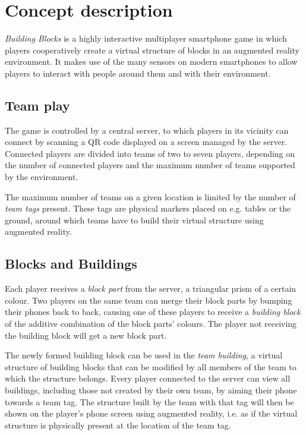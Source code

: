 \documentclass[a4paper,titlepage]{scrartcl}
\begin{document}
\section{Concept description}
\textit{Building Blocks} is a highly interactive multiplayer smartphone game in which players cooperatively create a virtual structure of blocks in an augmented reality environment. It makes use of the many sensors on modern smartphones to allow players to interact with people around them and with their environment.

\subsection{Team play}
The game is controlled by a central server, to which players in its vicinity can connect by scanning a QR code displayed on a screen managed by the server. Connected players are divided into teams of two to seven players, depending on the number of connected players and the maximum number of teams supported by the environment.

The maximum number of teams on a given location is limited by the number of \textit{team tags} present. These tags are physical markers placed on e.g. tables or the ground, around which teams have to build their virtual structure using augmented reality.

\subsection{Blocks and Buildings}
Each player receives a \textit{block part} from the server, a triangular prism of a certain colour. Two players on the same team can merge their block parts by bumping their phones back to back, causing one of these players to receive a \textit{building block} of the additive combination of the block parts' colours. The player not receiving the building block will get a new block part.

The newly formed building block can be used in the \textit{team building}, a virtual structure of building blocks that can be modified by all members of the team to which the structure belongs. Every player connected to the server can view all buildings, including those not created by their own team, by aiming their phone towards a team tag. The structure built by the team with that tag will then be shown on the player's phone screen using augmented reality, i.e. as if the virtual structure is physically present at the location of the team tag.
\end{document}
